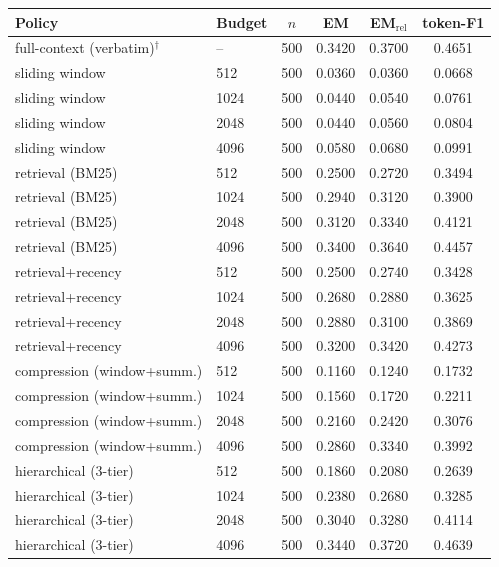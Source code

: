 \begin{tabular}{llcccc}
\toprule
Policy & Budget & $n$ & EM & EM$_{\text{rel}}$ & token-F1 \\
\midrule
full-context (verbatim)$^{\dagger}$ & -- & 500 & 0.3420 & 0.3700 & 0.4651 \\
sliding window & 512 & 500 & 0.0360 & 0.0360 & 0.0668 \\
sliding window & 1024 & 500 & 0.0440 & 0.0540 & 0.0761 \\
sliding window & 2048 & 500 & 0.0440 & 0.0560 & 0.0804 \\
sliding window & 4096 & 500 & 0.0580 & 0.0680 & 0.0991 \\
retrieval (BM25) & 512 & 500 & 0.2500 & 0.2720 & 0.3494 \\
retrieval (BM25) & 1024 & 500 & 0.2940 & 0.3120 & 0.3900 \\
retrieval (BM25) & 2048 & 500 & 0.3120 & 0.3340 & 0.4121 \\
retrieval (BM25) & 4096 & 500 & 0.3400 & 0.3640 & 0.4457 \\
retrieval+recency & 512 & 500 & 0.2500 & 0.2740 & 0.3428 \\
retrieval+recency & 1024 & 500 & 0.2680 & 0.2880 & 0.3625 \\
retrieval+recency & 2048 & 500 & 0.2880 & 0.3100 & 0.3869 \\
retrieval+recency & 4096 & 500 & 0.3200 & 0.3420 & 0.4273 \\
compression (window+summ.) & 512 & 500 & 0.1160 & 0.1240 & 0.1732 \\
compression (window+summ.) & 1024 & 500 & 0.1560 & 0.1720 & 0.2211 \\
compression (window+summ.) & 2048 & 500 & 0.2160 & 0.2420 & 0.3076 \\
compression (window+summ.) & 4096 & 500 & 0.2860 & 0.3340 & 0.3992 \\
hierarchical (3-tier) & 512 & 500 & 0.1860 & 0.2080 & 0.2639 \\
hierarchical (3-tier) & 1024 & 500 & 0.2380 & 0.2680 & 0.3285 \\
hierarchical (3-tier) & 2048 & 500 & 0.3040 & 0.3280 & 0.4114 \\
hierarchical (3-tier) & 4096 & 500 & 0.3440 & 0.3720 & 0.4639 \\
\bottomrule
\end{tabular}